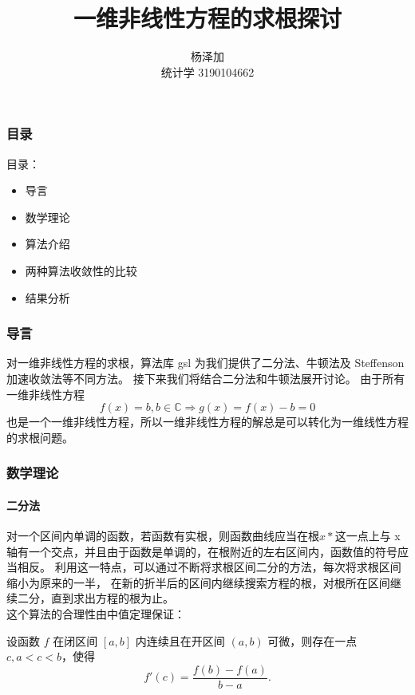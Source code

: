 \documentclass[UTF8]{ctexbeamer}
\title[一维非线性方程的求根] %
{一维非线性方程的求根探讨}
\author{杨泽加 \\ 统计学 3190104662}
\institute[ZJU] %
{
    ZJU\\
    Statistics class 1901
}
\begin{document}
    \maketitle
    \begin{frame}
        \frametitle{目录}
        目录：
        \begin{itemize}
            \item 导言
            \item 数学理论
            \item 算法介绍
            \item 两种算法收敛性的比较
            \item 结果分析
        \end{itemize}
    \end{frame}
    \begin{frame}
        \frametitle{导言}
        对一维非线性方程的求根，算法库 gsl 为我们提供了二分法、牛顿法及 Steffenson
        加速收敛法等不同方法。
        接下来我们将结合二分法和牛顿法展开讨论。
        由于所有一维非线性方程    \\
        \begin{equation}
            \label{E1}
            f(x) = b, b \in \mathbb{C} \Rightarrow g(x) = f(x) - b = 0
        \end{equation}
        也是一个一维非线性方程，所以一维非线性方程的解总是可以转化为一维线性方程的求根问题。
    \end{frame}
    \begin{frame}
        \frametitle{数学理论}
        \framesubtitle{二分法}
        对一个区间内单调的函数，若函数有实根，则函数曲线应当在根$x*$这一点上与
        x轴有一个交点，并且由于函数是单调的，在根附近的左右区间内，函数值的符号应当相反。
        利用这一特点，可以通过不断将求根区间二分的方法，每次将求根区间缩小为原来的一半，
        在新的折半后的区间内继续搜索方程的根，对根所在区间继续二分，直到求出方程的根为止。 \\
        这个算法的合理性由中值定理保证：\\
        \begin{theorem}[中值定理]
            \label{T1}
            设函数 $f$ 在闭区间 $[a,b]$ 内连续且在开区间 $(a,b)$ 可微，则存在一点
            $c, a < c < b$，使得
            \begin{equation}
                \label{E2}
                f'(c) = \frac{f(b) - f(a)}{b - a}.
            \end{equation}
        \end{theorem}
    \end{frame}
\end{document}
